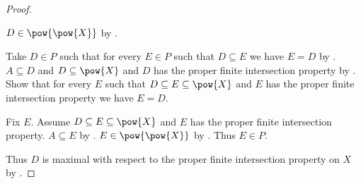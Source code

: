 \begin{proof}
\begin{subproof}
        $D\in\pow{\pow{X}}$ by .
    \end{subproof}

    Take $D\in P$ such that for every $E\in P$ such that $D\subseteq E$
        we have $E=D$ by .
    $A\subseteq D$ and $D\subseteq\pow{X}$ and
        $D$ has the proper finite intersection property by .
    Show that for every $E$ such that $D\subseteq E\subseteq\pow{X}$ and
        $E$ has the proper finite intersection property we have $E=D$.
    \begin{subproof}
        Fix $E$.
        Assume $D\subseteq E\subseteq\pow{X}$ and
            $E$ has the proper finite intersection property.
        $A\subseteq E$ by .
        $E\in\pow{\pow{X}}$ by .
        Thus $E\in P$.
    \end{subproof}
    Thus $D$ is maximal with respect to the proper finite intersection property on $X$
        by .
\end{proof}
